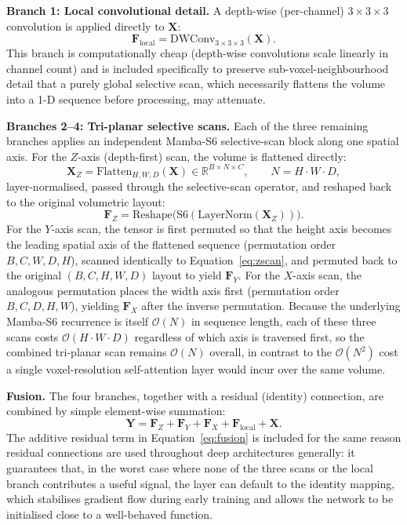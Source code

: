 \documentclass[pdflatex,sn-mathphys-num]{sn-jnl}
\begin{document}
\textbf{Branch 1: Local convolutional detail.}
A depth-wise (per-channel) $3\!\times\!3\!\times\!3$ convolution is
applied directly to $\mathbf{X}$:
\begin{equation}
\mathbf{F}_\text{local} = \text{DWConv}_{3\times3\times3}(\mathbf{X}).
\label{eq:local}
\end{equation}
This branch is computationally cheap (depth-wise convolutions scale
linearly in channel count) and is included specifically to preserve
sub-voxel-neighbourhood detail that a purely global selective scan,
which necessarily flattens the volume into a 1-D sequence before
processing, may attenuate.

\textbf{Branches 2--4: Tri-planar selective scans.}
Each of the three remaining branches applies an independent Mamba-S6
selective-scan block \citep{gu2023mamba} along one spatial axis. For
the $Z$-axis (depth-first) scan, the volume is flattened directly:
\begin{equation}
\mathbf{X}_Z = \text{Flatten}_{H,W,D}(\mathbf{X}) \in
\mathbb{R}^{B \times N \times C}, \qquad N = H \cdot W \cdot D,
\label{eq:flatten}
\end{equation}
layer-normalised, passed through the selective-scan operator, and
reshaped back to the original volumetric layout:
\begin{equation}
\mathbf{F}_Z = \text{Reshape}\!\big(\text{S6}(\text{LayerNorm}(\mathbf{X}_Z))\big).
\label{eq:zscan}
\end{equation}
For the $Y$-axis scan, the tensor is first permuted so that the
height axis becomes the leading spatial axis of the flattened
sequence (permutation order $B,C,W,D,H$), scanned identically to
Equation~\eqref{eq:zscan}, and permuted back to the original
$(B,C,H,W,D)$ layout to yield $\mathbf{F}_Y$. For the $X$-axis scan,
the analogous permutation places the width axis first
(permutation order $B,C,D,H,W$), yielding $\mathbf{F}_X$ after the
inverse permutation. Because the underlying Mamba-S6 recurrence is
itself $\mathcal{O}(N)$ in sequence length, each of these three scans
costs $\mathcal{O}(H \cdot W \cdot D)$ regardless of which axis is
traversed first, so the combined tri-planar scan remains
$\mathcal{O}(N)$ overall, in contrast to the $\mathcal{O}(N^2)$ cost a
single voxel-resolution self-attention layer would incur over the same
volume.

\textbf{Fusion.} The four branches, together with a residual
(identity) connection, are combined by simple element-wise summation:
\begin{equation}
\mathbf{Y} = \mathbf{F}_Z + \mathbf{F}_Y + \mathbf{F}_X +
\mathbf{F}_\text{local} + \mathbf{X}.
\label{eq:fusion}
\end{equation}
The additive residual term in Equation~\eqref{eq:fusion} is included
for the same reason residual connections are used throughout deep
architectures generally: it guarantees that, in the worst case where
none of the three scans or the local branch contributes a useful
signal, the layer can default to the identity mapping, which
stabilises gradient flow during early training and allows the network
to be initialised close to a well-behaved function.
\end{document}
